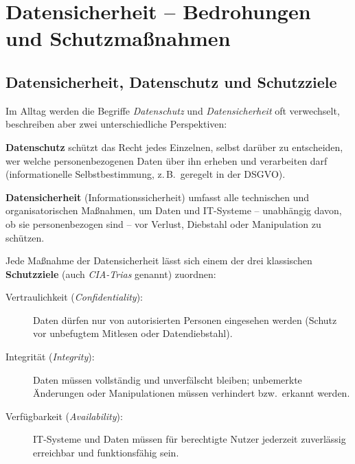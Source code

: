 \chapter{Datensicherheit -- Bedrohungen und Schutzmaßnahmen}
\renewcommand{\chaptertitle}{Datensicherheit -- Bedrohungen und Schutzmaßnahmen}

\lehead[]{\normalfont\sffamily\hspace*{-2.00cm}\textcolor{white}{\colorbox{lightblue}{\makebox[1.60cm][r]{\thechapter}}}\hspace{0.17cm}\textcolor{lightblue}{\chaptertitle}}
\rohead[]{\textcolor{lightblue}{\chaptertitle}\normalfont\sffamily\hspace*{0.17cm}\textcolor{white}{\colorbox{lightblue}{\makebox[1.60cm][l]{\thechapter}}}\hspace{-2.00cm}}
\rehead[]{\textcolor{lightblue}{AvHG, Inf, My}}
\lohead[]{\textcolor{lightblue}{AvHG, Inf, My}}

\section{Datensicherheit, Datenschutz und Schutzziele}

Im Alltag werden die Begriffe \emph{Datenschutz} und \emph{Datensicherheit} oft
verwechselt, beschreiben aber zwei unterschiedliche Perspektiven:

\begin{compactitem}
\item \textbf{Datenschutz} schützt das Recht jedes Einzelnen, selbst darüber
zu entscheiden, wer welche personenbezogenen Daten über ihn erheben und
verarbeiten darf (informationelle Selbstbestimmung, z.\,B.\ geregelt in der
DSGVO).
\item \textbf{Datensicherheit} (Informationssicherheit) umfasst alle
technischen und organisatorischen Maßnahmen, um Daten und IT-Systeme --
unabhängig davon, ob sie personenbezogen sind -- vor Verlust, Diebstahl oder
Manipulation zu schützen.
\end{compactitem}

Jede Maßnahme der Datensicherheit lässt sich einem der drei klassischen
\textbf{Schutzziele} (auch \emph{CIA-Trias} genannt) zuordnen:

\begin{description}
\item[Vertraulichkeit (\emph{Confidentiality}):] Daten dürfen nur von
autorisierten Personen eingesehen werden (Schutz vor unbefugtem Mitlesen oder
Datendiebstahl).
\item[Integrität (\emph{Integrity}):] Daten müssen vollständig und unverfälscht
bleiben; unbemerkte Änderungen oder Manipulationen müssen verhindert bzw.\
erkannt werden.
\item[Verfügbarkeit (\emph{Availability}):] IT-Systeme und Daten müssen für
berechtigte Nutzer jederzeit zuverlässig erreichbar und funktionsfähig sein.
\end{description}


